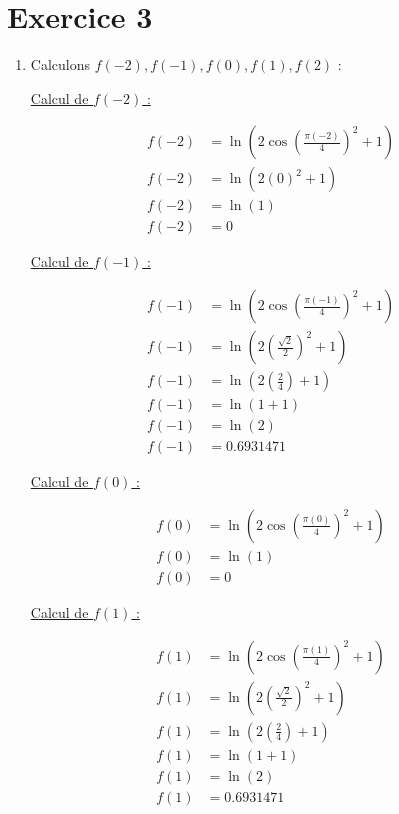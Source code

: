 \documentclass[12pt, letterpaper]{article}
\begin{document}
\section*{Exercice 3}

\begin{enumerate}
\item Calculons $f(-2), f(-1), f(0), f(1), f(2)$ :

  \underline{Calcul de $f(-2)$ :}
  
  \begin{equation*}
    \begin{split}
      f(-2) & = \ln(2\cos(\frac{\pi(-2)}{4})^2 + 1) \\
      f(-2) & = \ln(2(0)^2 + 1) \\
      f(-2) & = \ln(1) \\
      f(-2) & = 0
    \end{split}
  \end{equation*}

  \underline{Calcul de $f(-1)$ :}
  
  \begin{equation*}
    \begin{split}
      f(-1) & = \ln(2\cos(\frac{\pi(-1)}{4})^2 + 1) \\
      f(-1) & = \ln(2(\frac{\sqrt{2}}{2})^2 + 1) \\
      f(-1) & = \ln(2(\frac{2}{4}) + 1) \\
      f(-1) & = \ln(1 + 1) \\
      f(-1) & = \ln(2) \\
      f(-1) & = 0.6931471
    \end{split}
  \end{equation*}

  \underline{Calcul de $f(0)$ :}
  
  \begin{equation*}
    \begin{split}
      f(0) & = \ln(2\cos(\frac{\pi(0)}{4})^2 + 1) \\
      f(0) & = \ln(1) \\
      f(0) & = 0
    \end{split}
  \end{equation*}

  \underline{Calcul de $f(1)$ :}
  
  \begin{equation*}
    \begin{split}
      f(1) & = \ln(2\cos(\frac{\pi(1)}{4})^2 + 1) \\
      f(1) & = \ln(2(\frac{\sqrt{2}}{2})^2 + 1) \\
      f(1) & = \ln(2(\frac{2}{4}) + 1) \\
      f(1) & = \ln(1 + 1) \\
      f(1) & = \ln(2) \\
      f(1) & = 0.6931471
    \end{split}
  \end{equation*}


\end{enumerate}
\end{document}
